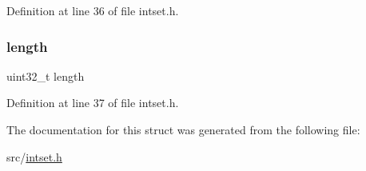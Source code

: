 Definition at line 36 of file intset.\+h.

\mbox{\label{structintset_aebb70c2aab3407a9f05334c47131a43b}} 
\subsubsection{\texorpdfstring{length}{length}}
{\footnotesize\ttfamily uint32\+\_\+t length}



Definition at line 37 of file intset.\+h.



The documentation for this struct was generated from the following file\+:\begin{DoxyCompactItemize}
\item 
src/\hyperlink{intset_8h}{intset.\+h}\end{DoxyCompactItemize}
